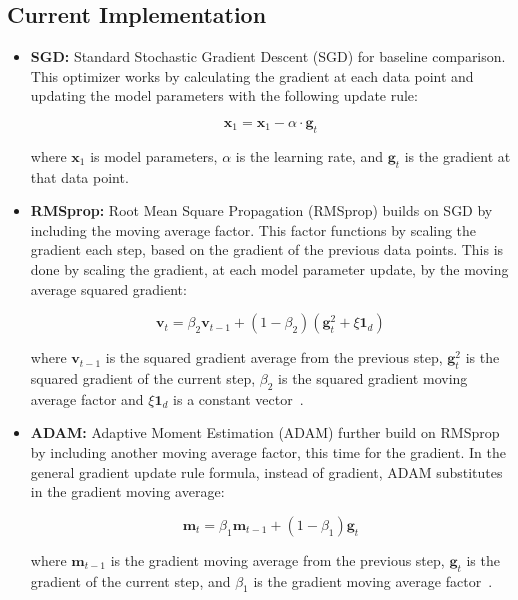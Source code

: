 \subsection{Current Implementation}\label{subsec:current-implementation}

\begin{itemize}
    \item \textbf{SGD:} Standard Stochastic Gradient Descent (SGD) for baseline comparison.
    This optimizer works by calculating the gradient at each data
    point and updating the model parameters with the following update rule:

    \[
        \mathbf{x}_1 = \mathbf{x}_1 - \alpha \cdot \mathbf{g}_t
    \]

    where $\mathbf{x}_1$ is model parameters, $\alpha$ is
    the learning rate, and $\mathbf{g}_t$ is the gradient at that data point.

    \item \textbf{RMSprop:} Root Mean Square Propagation (RMSprop) builds on SGD by including the moving average factor.
    This factor functions by scaling the gradient
    each step, based on the gradient of the previous data points.
    This is done by scaling the gradient, at each model parameter update,
    by the moving average squared gradient:

    \[
        \mathbf{v}_t = \beta_2 \mathbf{v}_{t-1} + (1 - \beta_2)(\mathbf{g}_t^2 + \xi \mathbf{1}_d)
    \]

    where $\mathbf{v}_{t-1}$ is the squared gradient average from the previous step, $\mathbf{g}_t^2 $ is
    the squared gradient of the current step, $\beta_2$ is the squared gradient moving average factor
    and $\xi \mathbf{1}_d$ is a constant vector~\cite{DBLP:journals/corr/abs-1807-06766,Jason_Huang_2020}.

    \item \textbf{ADAM:} Adaptive Moment Estimation (ADAM) further build on RMSprop by including another moving average factor, this time for the gradient.
    In the general gradient update rule formula, instead of gradient,
    ADAM substitutes in the gradient moving average:

    \[
        \mathbf{m}_t = \beta_1 \mathbf{m}_{t-1} + (1 - \beta_1) \mathbf{g}_t
    \]

    where $\mathbf{m}_{t-1}$ is the gradient moving average from the previous step, $\mathbf{g}_t$ is
    the gradient of the current step, and $\beta_1$ is the gradient moving average factor~\cite{DBLP:journals/corr/abs-1807-06766}.

\end{itemize}

